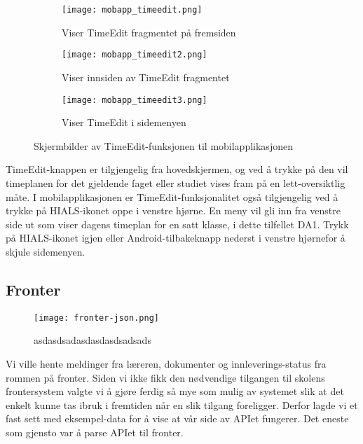 \documentclass[../main.tex]{subfiles}
\begin{document}
\begin{figure}[H]
        \centering
        \begin{subfigure}[b]{0.3\textwidth}
                \centering
                \texttt{[image: mobapp\_timeedit.png]}
                \caption{Viser TimeEdit fragmentet på fremsiden}
        \end{subfigure}
        \quad
        \begin{subfigure}[b]{0.3\textwidth}
                \centering
                \texttt{[image: mobapp\_timeedit2.png]}
                \caption{Viser innsiden av TimeEdit fragmentet}
        \end{subfigure}
        \quad
                \begin{subfigure}[b]{0.3\textwidth}
                        \centering
                        \texttt{[image: mobapp\_timeedit3.png]}
                        \caption{Viser TimeEdit i sidemenyen}
                \end{subfigure}
        \caption{Skjermbilder av TimeEdit-funksjonen til mobilapplikasjonen}
\end{figure}

TimeEdit-knappen er tilgjengelig fra hovedskjermen, og ved å trykke på den vil timeplanen for det gjeldende faget eller studiet vises fram på en lett-oversiktlig måte.
I mobilapplikasjonen er TimeEdit-funksjonalitet også tilgjengelig ved å trykke på HIALS-ikonet oppe i venstre hjørne. En meny vil gli inn fra venstre side ut som viser dagens timeplan for en satt klasse, i dette tilfellet DA1. Trykk på HIALS-ikonet igjen eller Android-tilbakeknapp nederst i venstre hjørnefor å skjule sidemenyen.








\subsection{Fronter}

\begin{figure}[H]
  \centering
  \texttt{[image: fronter-json.png]}
  \caption{asdasdsadasdasdasdsadsads}
\end{figure}

Vi ville hente meldinger fra læreren, dokumenter og innleverings-status fra rommen på fronter.\newline
\newline
Siden vi ikke fikk den nødvendige tilgangen til skolens frontersystem valgte vi å gjøre ferdig så mye som mulig av systemet slik at det enkelt kunne tas ibruk i fremtiden når en slik tilgang foreligger. Derfor lagde vi et fast sett med eksempel-data for å vise at vår side av APIet fungerer. Det eneste som gjensto var å parse APIet til fronter.
\end{document}
